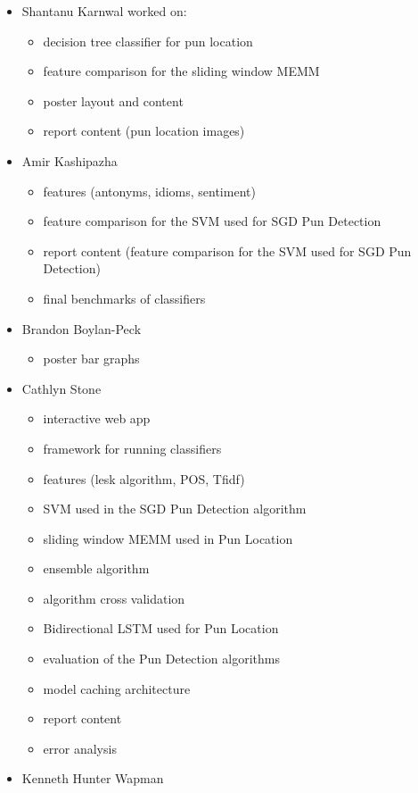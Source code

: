 \documentclass{article}
\begin{document}
\begin{itemize}
\item Shantanu Karnwal worked on:
	\begin{itemize}
		\item decision tree classifier for pun location
		\item feature comparison for the sliding window MEMM
		\item poster layout and content
		\item report content (pun location images)
	\end{itemize}
\item Amir Kashipazha
	\begin{itemize}
		\item features (antonyms, idioms, sentiment)
		\item feature comparison for the SVM used for SGD Pun Detection
		\item report content (feature comparison for the SVM used for SGD Pun Detection)
		\item final benchmarks of classifiers
	\end{itemize}
\item Brandon Boylan-Peck
	\begin{itemize}
		\item poster bar graphs
	\end{itemize}
\item Cathlyn Stone
	\begin{itemize}
		\item interactive web app
		\item framework for running classifiers
		\item features (lesk algorithm, POS, Tfidf)
		\item SVM used in the SGD Pun Detection algorithm
		\item sliding window MEMM used in Pun Location
		\item ensemble algorithm
		\item algorithm cross validation
		\item Bidirectional LSTM used for Pun Location
		\item evaluation of the Pun Detection algorithms
		\item model caching architecture
		\item report content 
		\item error analysis
	\end{itemize}
\item Kenneth Hunter Wapman
	\begin{itemize}

\end{itemize}
\end{itemize}
\end{document}
